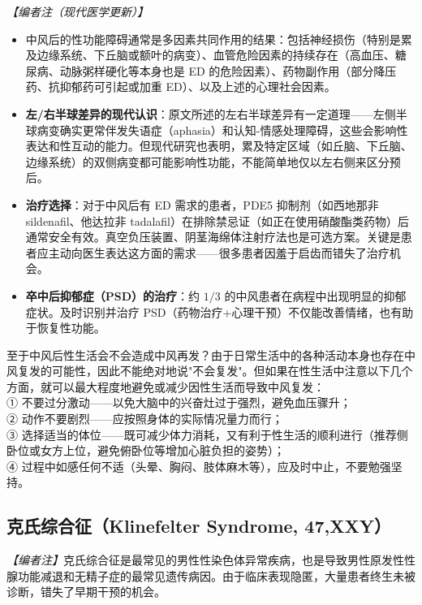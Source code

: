 \documentclass[12pt,a4paper,twoside]{ctexbook}
\begin{document}
\noindent\textit{【编者注（现代医学更新）】}
\begin{itemize}
	\item 中风后的性功能障碍通常是多因素共同作用的结果：包括神经损伤（特别是累及边缘系统、下丘脑或额叶的病变）、血管危险因素的持续存在（高血压、糖尿病、动脉粥样硬化等本身也是 ED 的危险因素）、药物副作用（部分降压药、抗抑郁药可引起或加重 ED）、以及上述的心理社会因素。
	\item \textbf{左/右半球差异的现代认识}：原文所述的左右半球差异有一定道理——左侧半球病变确实更常伴发失语症（aphasia）和认知-情感处理障碍，这些会影响性表达和性互动的能力。但现代研究也表明，累及特定区域（如丘脑、下丘脑、边缘系统）的双侧病变都可能影响性功能，不能简单地仅以左右侧来区分预后。
	\item \textbf{治疗选择}：对于中风后有 ED 需求的患者，PDE5 抑制剂（如西地那非 sildenafil、他达拉非 tadalafil）在排除禁忌证（如正在使用硝酸酯类药物）后通常安全有效。真空负压装置、阴茎海绵体注射疗法也是可选方案。关键是患者应主动向医生表达这方面的需求——很多患者因羞于启齿而错失了治疗机会。
	\item \textbf{卒中后抑郁症（PSD）的治疗}：约 $1/3$ 的中风患者在病程中出现明显的抑郁症状。及时识别并治疗 PSD（药物治疗+心理干预）不仅能改善情绪，也有助于恢复性功能。
\end{itemize}

\begin{tcolorbox}[colback=pink!5!white,colframe=red!50!black,title=贴心小叮咛]
至于中风后性生活会不会造成中风再发？由于日常生活中的各种活动本身也存在中风复发的可能性，因此不能绝对地说"不会复发"。但如果在性生活中注意以下几个方面，就可以最大程度地避免或减少因性生活而导致中风复发：\\
① 不要过分激动——以免大脑中的兴奋灶过于强烈，避免血压骤升；\\
② 动作不要剧烈——应按照身体的实际情况量力而行；\\
③ 选择适当的体位——既可减少体力消耗，又有利于性生活的顺利进行（推荐侧卧位或女方上位，避免俯卧位等增加心脏负担的姿势）；\\
④ 过程中如感任何不适（头晕、胸闷、肢体麻木等），应及时中止，不要勉强坚持。
\end{tcolorbox}

\subsection{克氏综合征（Klinefelter Syndrome, 47,XXY）}

\noindent\textit{【编者注】}克氏综合征是最常见的男性性染色体异常疾病，也是导致男性原发性性腺功能减退和无精子症的最常见遗传病因。由于临床表现隐匿，大量患者终生未被诊断，错失了早期干预的机会。
\end{document}

